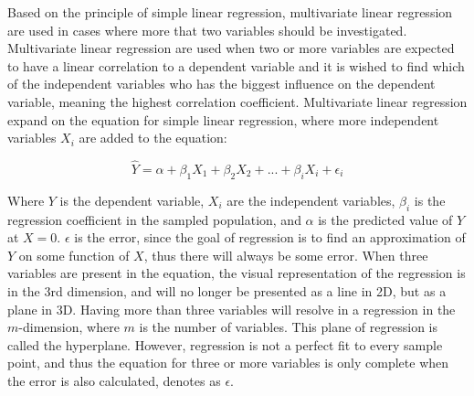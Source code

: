 

Based on the principle of simple linear regression, multivariate linear regression are used in cases where more that two variables should be investigated. Multivariate linear regression are used when two or more variables are expected to have a linear correlation to a dependent variable and it is wished to find which of the independent variables who has the biggest influence on the dependent variable, meaning the highest correlation coefficient. 
Multivariate linear regression expand on the equation for simple linear regression, where more independent variables $X_i$ are added to the equation: \cite{zar2009}

\begin{equation}
\hat{Y} = \alpha + \beta_1 X_{1} + \beta_2 X_{2} + ... + \beta_i X_{i} + \epsilon_i
\end{equation}

Where $Y$ is the dependent variable, $X_i$ are the independent variables, $\beta_i$ is the regression coefficient in the sampled population, and $\alpha$ is the predicted value of $Y$ at $X = 0$. $\epsilon$ is the error, since the goal of regression is to find an approximation of $Y$ on some function of $X$, thus there will always be some error.
When three variables are present in the equation, the visual representation of the regression is in the 3rd dimension, and will no longer be presented as a line in 2D, but as a plane in 3D. Having more than three variables will resolve in a regression in the $m$-dimension, where $m$ is the number of variables. This plane of regression is called the hyperplane. However, regression is not a perfect fit to every sample point, and thus the equation for three or more variables is only complete when the error is also calculated, denotes as $\epsilon$.


